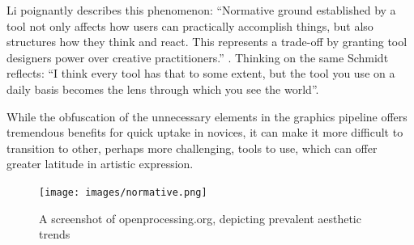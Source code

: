 Li poignantly describes this phenomenon: \enquote{Normative ground established by a tool not only affects how users can practically accomplish things, but also structures how they think and react. This represents a trade-off by granting tool designers power over creative practitioners.} \parencite[65]{liRethinkingPowerDynamics2023}. Thinking on the same Schmidt reflects:  \enquote{I think every tool has that to some extent, but the tool you use on a daily basis becomes the lens through which you see the world}.

While the obfuscation of the unnecessary elements in the graphics pipeline offers tremendous benefits for quick uptake in novices, it can make it more difficult to transition to other, perhaps more challenging, tools to use, which can offer greater latitude in artistic expression. 



\clearpage

\begin{figure}
    \centering
    \texttt{[image: images/normative.png]}
    \caption[Openprocessing screenshot]{A screenshot of openprocessing.org, depicting  prevalent aesthetic trends}
    \label{fig:normative}
\end{figure}
